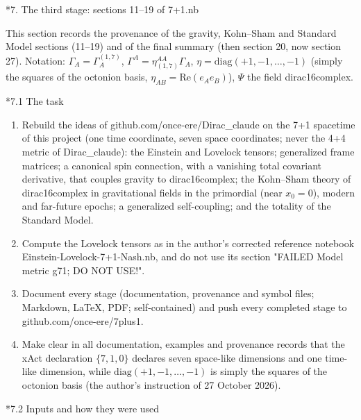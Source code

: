 \documentclass[10pt,a4paper]{article}
\makeatletter
\renewcommand\section{\@startsection{section}{1}{\z@}{-3.5ex \@plus -1ex \@minus -.2ex}{2.3ex \@plus.2ex}{\normalfont\Large\bfseries\raggedright}}
\renewcommand\subsection{\@startsection{subsection}{2}{\z@}{-3.25ex\@plus -1ex \@minus -.2ex}{1.5ex \@plus .2ex}{\normalfont\large\bfseries\raggedright}}
\makeatother
\begin{document}
\section*{7. The third stage: sections 11–19 of 7+1.nb}
This section records the provenance of the gravity, Kohn–Sham and Standard Model sections (11–19) and of the final summary (then section 20, now section 27). Notation: $\Gamma_A=\Gamma^{(1,7)}_A$, $\Gamma^A=\eta_{(1,7)}^{AA}\Gamma_A$, $\eta=\mathrm{diag}(+1,-1,\dots,-1)$ (simply the squares of the octonion basis, $\eta_{AB}=\mathrm{Re}(e_Ae_B)$), $\Psi$ the field dirac16complex.

\subsection*{7.1 The task}
\begin{enumerate}
\item Rebuild the ideas of github.com/once-ere/Dirac\_claude on the 7+1 spacetime of this project (one time coordinate, seven space coordinates; never the 4+4 metric of Dirac\_claude): the Einstein and Lovelock tensors; generalized frame matrices; a canonical spin connection, with a vanishing total covariant derivative, that couples gravity to dirac16complex; the Kohn–Sham theory of dirac16complex in gravitational fields in the primordial (near $x_0=0$), modern and far-future epochs; a generalized self-coupling; and the totality of the Standard Model.
\item Compute the Lovelock tensors as in the author’s corrected reference notebook Einstein-Lovelock-7+1-Nash.nb, and do not use its section "FAILED Model metric g71; DO NOT USE!".
\item Document every stage (documentation, provenance and symbol files; Markdown, LaTeX, PDF; self-contained) and push every completed stage to github.com/once-ere/7plus1.
\item Make clear in all documentation, examples and provenance records that the xAct declaration $\{7,1,0\}$ declares seven space-like dimensions and one time-like dimension, while $\mathrm{diag}(+1,-1,\dots,-1)$ is simply the squares of the octonion basis (the author’s instruction of 27 October 2026).
\end{enumerate}
\subsection*{7.2 Inputs and how they were used}
\end{document}
